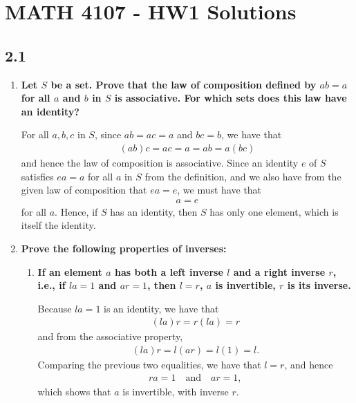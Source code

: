 \documentclass[a4paper,12pt]{article}
\begin{document}
\section*{MATH 4107 - HW1 Solutions}

\subsection*{2.1}
\begin{enumerate}
    \item
        \boldmath
        \textbf{Let $S$ be a set. Prove that the law of composition defined by $ab = a$ for all $a$ and $b$ in $S$ is associative. For which sets does this law have an identity?} \par
        \unboldmath
        For all $a, b, c$ in $S$, since $ab = ac = a$ and $bc = b$, we have that
        \begin{align*}
            (ab)c = ac = a = ab = a(bc)
        \end{align*}
        and hence the law of composition is associative. Since an identity $e$ of $S$ satisfies $ea = a$ for all $a$ in $S$ from the definition, and we also have from the given law of composition that $ea = e$, we must have that
        \begin{align*}
            a = e
        \end{align*}
        for all $a$. Hence, if $S$ has an identity, then $S$ has only one element, which is itself the identity.

    \item
        \boldmath
        \textbf{Prove the following properties of inverses:} \par
        \unboldmath
        \begin{enumerate}
            \item
                \boldmath
                \textbf{If an element $a$ has both a left inverse $l$ and a right inverse $r$, i.e., if $la = 1$ and $ar = 1$, then $l = r$, $a$ is invertible, $r$ is its inverse.} \par
                \unboldmath
                Because $la = 1$ is an identity, we have that
                \begin{align*}
                    (la)r = r(la) = r
                \end{align*}
                and from the associative property,
                \begin{align*}
                    (la)r = l(ar) = l(1) = l.
                \end{align*}
                Comparing the previous two equalities, we have that $l = r$, and hence
                \begin{align*}
                    ra = 1 \quad \text{and} \quad ar = 1,
                \end{align*}
                which shows that $a$ is invertible, with inverse $r$.


\end{enumerate}
\end{enumerate}
\end{document}
